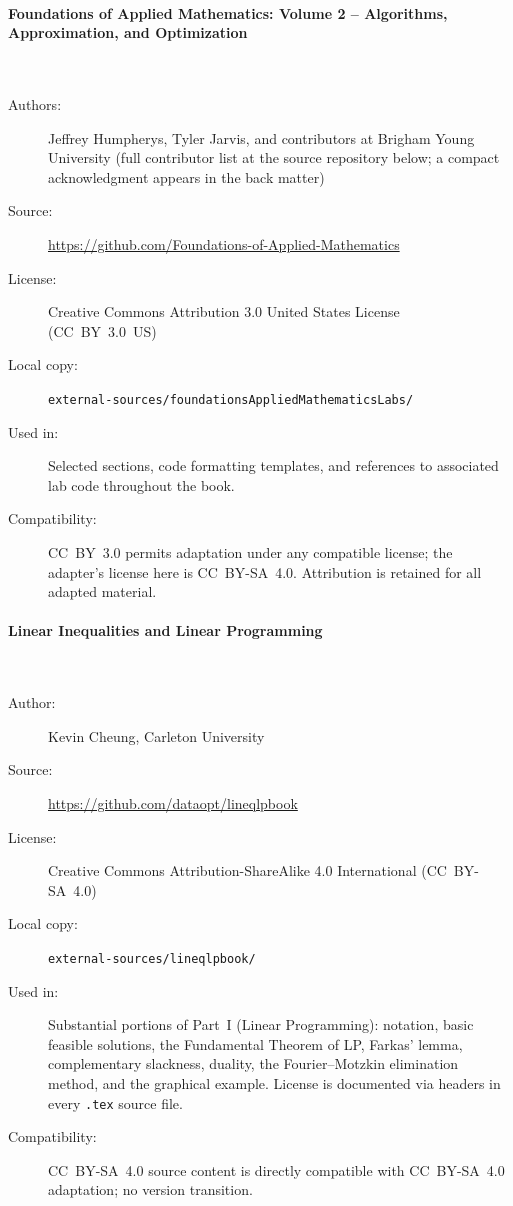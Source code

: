 \paragraph{Foundations of Applied Mathematics: Volume 2 -- Algorithms,
  Approximation, and Optimization}\hspace{0pt}\\[-0.6em]
\begin{description}
  \item[Authors:] Jeffrey Humpherys, Tyler Jarvis, and contributors at
    Brigham Young University (full contributor list at the source
    repository below; a compact acknowledgment appears in the back matter)
  \item[Source:] \url{https://github.com/Foundations-of-Applied-Mathematics}
  \item[License:] Creative Commons Attribution 3.0 United States License
    (CC~BY~3.0~US)
  \item[Local copy:] \texttt{external-sources/foundationsAppliedMathematicsLabs/}
  \item[Used in:] Selected sections, code formatting templates, and
    references to associated lab code throughout the book.
  \item[Compatibility:] CC~BY~3.0 permits adaptation under any
    compatible license; the adapter's license here is CC~BY-SA~4.0.
    Attribution is retained for all adapted material.
\end{description}

\paragraph{Linear Inequalities and Linear Programming}\hspace{0pt}\\[-0.6em]
\begin{description}
  \item[Author:] Kevin Cheung, Carleton University
  \item[Source:] \url{https://github.com/dataopt/lineqlpbook}
  \item[License:] Creative Commons Attribution-ShareAlike 4.0
    International (CC~BY-SA~4.0)
  \item[Local copy:] \texttt{external-sources/lineqlpbook/}
  \item[Used in:] Substantial portions of Part~I (Linear Programming):
    notation, basic feasible solutions, the Fundamental Theorem of LP,
    Farkas' lemma, complementary slackness, duality, the Fourier--Motzkin
    elimination method, and the graphical example. License is documented
    via headers in every \texttt{.tex} source file.
  \item[Compatibility:] CC~BY-SA~4.0 source content is directly
    compatible with CC~BY-SA~4.0 adaptation; no version transition.
\end{description}

